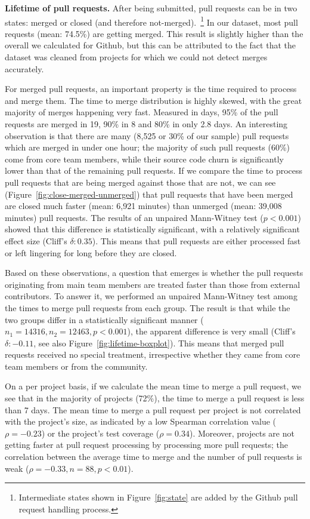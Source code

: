 \documentclass{acm_proc_article-sp}
\begin{document}
\textbf{Lifetime of pull requests.}
After being submitted, pull requests can be in two states: merged or closed
(and therefore not-merged).~\footnote{Intermediate states shown in
Figure~\ref{fig:state} are added by the Github pull request handling process.} 
In our dataset, most pull requests (mean: 74.5\%) are getting
merged. This result is slightly higher than the overall we calculated for
Github, but this can be attributed to the fact that the dataset was cleaned
from projects for which we could not detect merges accurately. 

For merged pull requests, an important property is the time required to process
and merge them. The time to merge distribution is highly skewed, with the great
majority of merges happening very fast. Measured in days, 95\% of the pull
requests are merged in 19, 90\% in 8 and 80\% in only 2.8 days. An interesting
observation is that there are many (8,525 or 30\% of our sample) pull requests
which are merged in under one hour; the majority of such pull requests (60\%)
come from core team members, while their source code churn is significantly
lower than that of the remaining pull requests. If we compare the time to
process pull requests that are being merged against those that are not, we can
see (Figure~\ref{fig:close-merged-unmerged}) that pull requests that have been
merged are closed much faster (mean: 6,921 minutes) than unmerged (mean: 39,008
minutes) pull requests.
The results of an unpaired Mann-Witney test ($p < 0.001$) showed that this difference is statistically significant, with a relatively
significant effect size (Cliff's $\delta: 0.35$). This means that pull requests
are either processed fast or left lingering for long before they are closed.

Based on these observations, a question that emerges is
whether the pull requests originating from main team members are treated faster
than those from external contributors. To answer it, we performed an unpaired
Mann-Witney test among the times to merge pull requests from each group. The
result is that while the two groups differ in a statistically significant manner
($n_1 = 14316, n_2 = 12463, p < 0.001$), the apparent difference is very small
(Cliff's $\delta: -0.11$, see also Figure~\ref{fig:lifetime-boxplot}). This
means that merged pull requests received no special treatment, irrespective
whether they came from core team members or from the community.

On a per project basis, if we calculate the mean time to merge a pull request,
we see that in the majority of projects (72\%), the time to merge a pull request
is less than 7 days. The mean time to merge a pull request per project is not
correlated with the project's size, as indicated by a low Spearman
correlation value ($\rho = -0.23$) or the project's test coverage ($\rho =
0.34$). 
Moreover, projects are not getting faster at pull request processing by
processing more pull requests; the correlation between the average time to merge
and the number of pull requests is weak ($\rho = -0.33, n = 88, p < 0.01$).
\end{document}
